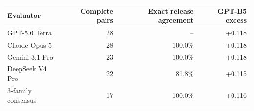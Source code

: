 \begin{tabular}{lrrr}
\toprule
Evaluator & Complete pairs & Exact release agreement & GPT-B5 excess \\
\midrule
GPT-5.6 Terra & 28 & -- & +0.118 \\
Claude Opus 5 & 28 & 100.0\% & +0.118 \\
Gemini 3.1 Pro & 23 & 100.0\% & +0.118 \\
DeepSeek V4 Pro & 22 & 81.8\% & +0.115 \\
3-family consensus & 17 & 100.0\% & +0.116 \\
\bottomrule
\end{tabular}
